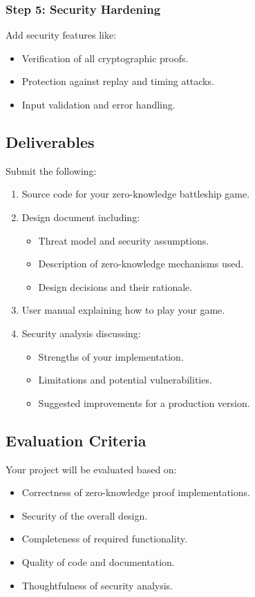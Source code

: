 \documentclass[10pt,a4paper,american]{article}
\begin{document}
\subsubsection*{Step 5: Security Hardening}
Add security features like:
\begin{itemize}
	\item Verification of all cryptographic proofs.
	\item Protection against replay and timing attacks.
	\item Input validation and error handling.
\end{itemize}

\subsection*{Deliverables}
Submit the following:

\begin{enumerate}
	\item Source code for your zero-knowledge battleship game.
	\item Design document including:
	      \begin{itemize}
		      \item Threat model and security assumptions.
		      \item Description of zero-knowledge mechanisms used.
		      \item Design decisions and their rationale.
	      \end{itemize}
	\item User manual explaining how to play your game.
	\item Security analysis discussing:
	      \begin{itemize}
		      \item Strengths of your implementation.
		      \item Limitations and potential vulnerabilities.
		      \item Suggested improvements for a production version.
	      \end{itemize}
\end{enumerate}

\subsection*{Evaluation Criteria}
Your project will be evaluated based on:

\begin{itemize}
	\item Correctness of zero-knowledge proof implementations.
	\item Security of the overall design.
	\item Completeness of required functionality.
	\item Quality of code and documentation.
	\item Thoughtfulness of security analysis.
\end{itemize}
\end{document}
